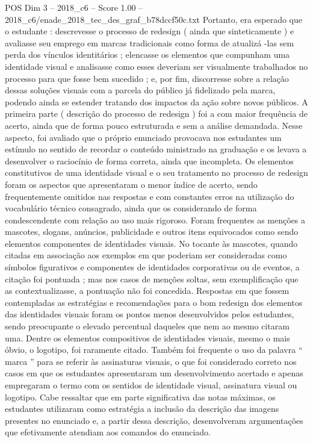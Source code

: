 \begin{textsample}{POS Dim 3 – 2018\_c6 – Score 1.00 – 2018\_c6/enade\_2018\_tec\_des\_graf\_b78dccf50c.txt}
Portanto, era esperado que o estudante : descrevesse o processo de redesign ( ainda que sinteticamente ) e avaliasse seu emprego em marcas tradicionais como forma de atualizá -las sem perda dos vínculos identitários ; elencasse os elementos que compunham uma identidade visual e analisasse como esses deveriam ser visualmente trabalhados no processo para que fosse bem sucedido ; e, por fim, discorresse sobre a relação dessas soluções visuais com a parcela do público já fidelizado pela marca, podendo ainda se estender tratando dos impactos da ação sobre novos públicos.
A primeira parte ( descrição do processo de redesign ) foi a com maior frequência de acerto, ainda que de forma pouco estruturada e sem a análise demandada.
Nesse aspecto, foi avaliado que o próprio enunciado provocava nos estudantes um estímulo no sentido de recordar o conteúdo ministrado na graduação e os levava a desenvolver o raciocínio de forma correta, ainda que incompleta.
Os elementos constitutivos de uma identidade visual e o seu tratamento no processo de redesign foram os aspectos que apresentaram o menor índice de acerto, sendo frequentemente omitidos nas respostas e com constantes erros na utilização do vocabulário técnico consagrado, ainda que os considerando de forma condescendente com relação ao uso mais rigoroso.
Foram frequentes as menções a mascotes, slogans, anúncios, publicidade e outros itens equivocados como sendo elementos componentes de identidades visuais.
No tocante às mascotes, quando citadas em associação aos exemplos em que poderiam ser consideradas como símbolos figurativos e componentes de identidades corporativas ou de eventos, a citação foi pontuada ; mas nos casos de menções soltas, sem exemplificação que as contextualizasse, a pontuação não foi concedida.
Respostas em que fossem contempladas as estratégias e recomendações para o bom redesign dos elementos das identidades visuais foram os pontos menos desenvolvidos pelos estudantes, sendo preocupante o elevado percentual daqueles que nem ao mesmo citaram uma.
Dentre os elementos compositivos de identidades visuais, mesmo o mais óbvio, o logotipo, foi raramente citado.
Também foi frequente o uso da palavra “ marca ” para se referir às assinaturas visuais, o que foi considerado correto nos casos em que os estudantes apresentaram um desenvolvimento acertado e apenas empregaram o termo com os sentidos de identidade visual, assinatura visual ou logotipo.
Cabe ressaltar que em parte significativa das notas máximas, os estudantes utilizaram como estratégia a inclusão da descrição das imagens presentes no enunciado e, a partir dessa descrição, desenvolveram argumentações que efetivamente atendiam aos comandos do enunciado.

\end{textsample}
